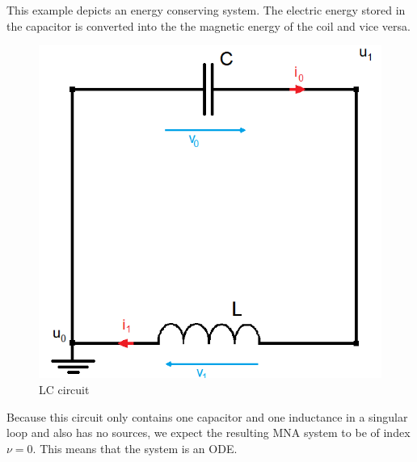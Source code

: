 	
\begin{example2}
	This example depicts an energy conserving system. The electric energy stored in the capacitor is converted into the the magnetic energy of the coil and vice versa.
	\begin{figure}[H]
		\centering
		\includegraphics[scale = 0.4]{pictures/Example2_index0.png}
		\caption{LC circuit}
	\end{figure}
	Because this circuit only contains one capacitor and one inductance in a singular loop and also has no sources, we expect the resulting MNA system to be of index $\nu=0$. This means that the system is an ODE.
	

\end{example2}
